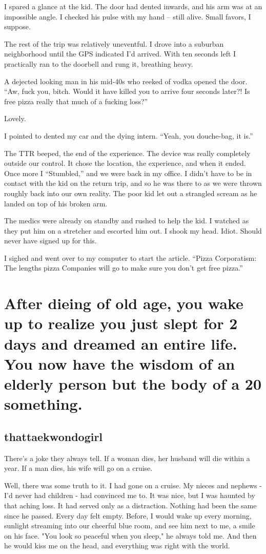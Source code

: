 I spared a glance at the kid. The door had dented inwards, and his arm was at an impossible angle. I checked his pulse with my hand – still alive. Small favors, I suppose.

The rest of the trip was relatively uneventful. I drove into a suburban neighborhood until the GPS indicated I’d arrived. With ten seconds left I practically ran to the doorbell and rung it, breathing heavy.

A dejected looking man in his mid-40s who reeked of vodka opened the door. “Aw, fuck you, bitch. Would it have killed you to arrive four seconds later?! Is free pizza really that much of a fucking loss?”

Lovely.

I pointed to dented my car and the dying intern. “Yeah, you douche-bag, it is.”

The TTR beeped, the end of the experience. The device was really completely outside our control. It chose the location, the experience, and when it ended. Once more I “Stumbled,” and we were back in my office. I didn’t have to be in contact with the kid on the return trip, and so he was there to as we were thrown roughly back into our own reality. The poor kid let out a strangled scream as he landed on top of his broken arm.

The medics were already on standby and rushed to help the kid. I watched as they put him on a stretcher and escorted him out. I shook my head. Idiot. Should never have signed up for this.

I sighed and went over to my computer to start the article. “Pizza Corporatism: The lengths pizza Companies will go to make sure you don’t get free pizza.”


\chapter{After dieing of old age, you wake up to realize you just slept for 2 days and dreamed an entire life. You now have the wisdom of an elderly person but the body of a 20 something.}
\section{thattaekwondogirl}

There's a joke they always tell. If a woman dies, her husband will die within a year. If a man dies, his wife will go on a cruise.

Well, there was some truth to it. I had gone on a cruise. My nieces and nephews - I'd never had children - had convinced me to. It was nice, but I was haunted by that aching loss. It had served only as a distraction. Nothing had been the same since he passed. Every day felt empty. Before, I would wake up every morning, sunlight streaming into our cheerful blue room, and see him next to me, a smile on his face. "You look so peaceful when you sleep," he always told me. And then he would kiss me on the head, and everything was right with the world.

